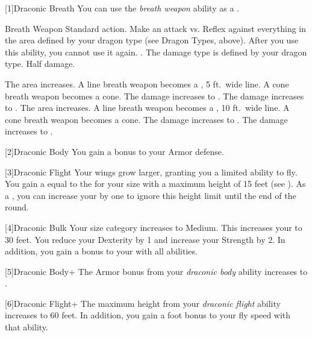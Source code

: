         [1]{Draconic Breath} You can use the \textit{breath weapon} ability as a .
        \begin{activeability}{Breath Weapon}
            \abilityusagetime Standard action.
            \rankline
            Make an attack vs. Reflex against everything in the area defined by your dragon type (see Dragon Types, above).
            After you use this ability, you  cannot use it again.
            \hit \damageranktwo{}.
            The damage type is defined by your dragon type.
            \miss Half damage.

            \rankline
             The area increases.
                A line breath weapon becomes a \arealarge, 5 ft.\ wide line.
                A cone breath weapon becomes a \areamed cone.
             The damage increases to \damagerankthree{}.
             The damage increases to \damagerankfour{}.
             The area increases.
                A line breath weapon becomes a \areahuge, 10 ft.\ wide line.
                A cone breath weapon becomes a \arealarge cone.
             The damage increases to \damageranksix{}.
             The damage increases to \damagerankseven{}.
        \end{activeability}

        [2]{Draconic Body} You gain a  bonus to your Armor defense.

        [3]{Draconic Flight} Your wings grow larger, granting you a limited ability to fly.
        You gain a  equal to the  for your size with a maximum height of 15 feet (see ).
        As a , you can increase your  by one to ignore this height limit until the end of the round.

        [4]{Draconic Bulk} Your size category increases to Medium.
        This increases your  to 30 feet.
        You reduce your Dexterity by 1 and increase your Strength by 2.
        In addition, you gain a  bonus to your  with all abilities.

        [5]{Draconic Body+} The Armor bonus from your \textit{draconic body} ability increases to .

        [6]{Draconic Flight+} The maximum height from your \textit{draconic flight} ability increases to 60 feet.
        In addition, you gain a  foot bonus to your fly speed with that ability.

